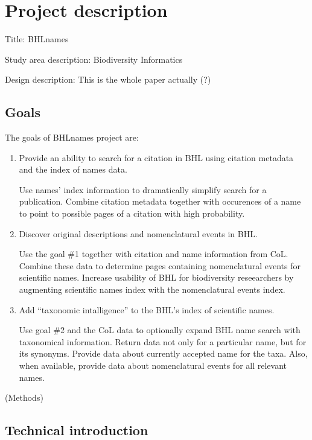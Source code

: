 \documentclass[
]{article}
\begin{document}
\hypertarget{project-description}{%
\section{Project description}\label{project-description}}

Title: BHLnames

Study area description: Biodiversity Informatics

Design description: This is the whole paper actually (?)

\hypertarget{goals}{%
\subsection{Goals}\label{goals}}

The goals of BHLnames project are:

\begin{enumerate}
\def\labelenumi{\arabic{enumi}.}
\item
  Provide an ability to search for a citation in BHL using citation
  metadata and the index of names data.

  Use names' index information to dramatically simplify search for a
  publication. Combine citation metadata together with occurences of a
  name to point to possible pages of a citation with high probability.
\item
  Discover original descriptions and nomenclatural events in BHL.

  Use the goal \#1 together with citation and name information from CoL.
  Combine these data to determine pages containing nomenclatural events
  for scientific names. Increase usability of BHL for biodiversity
  reseearchers by augmenting scientific names index with the
  nomenclatural events index.
\item
  Add ``taxonomic intalligence'' to the BHL's index of scientific names.

  Use goal \#2 and the CoL data to optionally expand BHL name search
  with taxonomical information. Return data not only for a particular
  name, but for its synonyms. Provide data about currently accepted name
  for the taxa. Also, when available, provide data about nomenclatural
  events for all relevant names.
\end{enumerate}

(Methods)

\hypertarget{technical-introduction}{%
\subsection{Technical introduction}\label{technical-introduction}}
\end{document}
